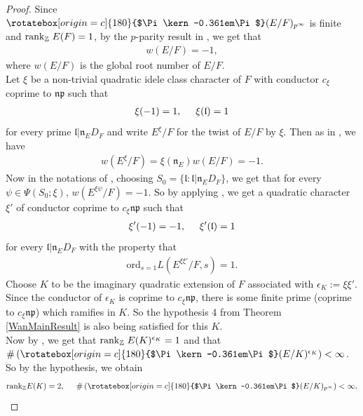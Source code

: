 \documentclass[reqno,10pt]{amsart}
\newcommand{\z}{\mathbb{Z}}
\newcommand{\p}{\mathfrak{p}}
\newcommand{\n}{\mathfrak{n}}
\newcommand{\Varpi}{\rotatebox[origin=c]{180}{$\Pi\kern-0.361em\Pi$}}
\theoremstyle{plain}
\theoremstyle{definition}
\begin{document}
\begin{proof}
    Since $\Varpi(E/F)_{p^\infty}$ is finite and $\mathrm{rank}_\z \hspace{0.01mm} \hspace{1mm} E(F) = 1$, by the $p$-parity result in \cite[Theorem 8.10]{NekParity}, we get that
    \begin{align*}
        w(E/F) = -1,
    \end{align*}
    where $w(E/F)$ is the global root number of $E/F$.
    \\
    Let $\xi$ be a non-trivial quadratic idele class character of $F$ with conductor $c_\xi$ coprime to $\n\p$ such that
    \begin{align*}
        \xi(-1) = 1, \hspace{5mm} \xi(\mathfrak{l}) = 1
    \end{align*}
    for every prime $\mathfrak{l}|\n_ED_F$ and write $E^\xi/F$ for the twist of $E/F$ by $\xi$. Then as in \cite[Section 2]{SignChanges}, we have
    \begin{align*}
        w(E^\xi/F) = \xi(\n_E)w(E/F) = -1.
    \end{align*}
    Now in the notations of \cite{FriedbergHoffstein}, choosing $S_0 = \{\mathfrak{l} : \mathfrak{l}|\n_ED_F\}$, we get that for every $\psi \in \Psi(S_0;\xi)$, $w(E^{\xi\psi}/F) = -1$. So by applying \cite[Theorem B(2)]{FriedbergHoffstein}, we get a quadratic character $\xi'$ of conductor coprime to $c_\xi\n\p$ such that
    \begin{align*}
        \xi'(-1) = -1, \hspace{5mm} \xi'(\mathfrak{l}) = 1
    \end{align*}
    for every $\mathfrak{l}|\n_ED_F$ with the property that
    \begin{align*}
        \mathrm{ord}_{s=1} L(E^{\xi\xi'}/F,s) = 1.
    \end{align*}
    Choose $K$ to be the imaginary quadratic extension of $F$ associated with $\epsilon_K := \xi\xi'$. Since the conductor of $\epsilon_K$ is coprime to $c_\xi\n\p$, there is some finite prime (coprime to $c_\xi\n\p$) which ramifies in $K$. So the hypothesis 4 from Theorem \ref{WanMainResult} is also being satisfied for this $K$.
    \\
    Now by \cite{Zhang}, we get that $\mathrm{rank}_\z \hspace{0.01mm} \hspace{1mm} E(K)^{\epsilon_K} = 1$ and that $\# \left( \Varpi(E/K)^{\epsilon_K} \right) < \infty$. So by the hypothesis, we obtain
    \begin{align*}
        \mathrm{rank}_\z \hspace{0.01mm} E(K) = 2, \hspace{5mm} \# \left( \Varpi(E/K)_{p^\infty} \right) < \infty.
    \end{align*}
\end{proof}
\end{document}

